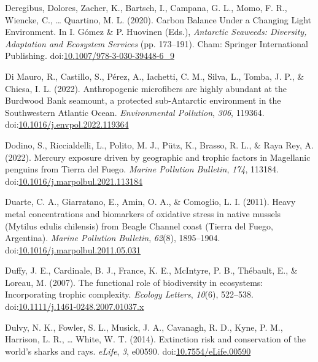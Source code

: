 \documentclass[
]{article}
\newlength{\cslhangindent}
\newenvironment{CSLReferences}[2] %
 {\begin{list}{}{%
  \setlength{\itemindent}{0pt}
  \setlength{\leftmargin}{0pt}
  \setlength{\parsep}{0pt}
  \ifodd #1
   \setlength{\leftmargin}{\cslhangindent}
   \setlength{\itemindent}{-1\cslhangindent}
  \fi
  \setlength{\itemsep}{#2\baselineskip}}}
 {\end{list}}
\begin{document}
\begin{CSLReferences}{1}{0}
Deregibus, Dolores, Zacher, K., Bartsch, I., Campana, G. L., Momo, F.
R., Wiencke, C., \ldots{} Quartino, M. L. (2020). Carbon {Balance Under}
a {Changing Light Environment}. In I. Gómez \& P. Huovinen (Eds.),
\emph{Antarctic {Seaweeds}: {Diversity}, {Adaptation} and {Ecosystem
Services}} (pp. 173--191). {Cham}: {Springer International Publishing}.
doi:\href{https://doi.org/10.1007/978-3-030-39448-6_9}{10.1007/978-3-030-39448-6\_9}

Di Mauro, R., Castillo, S., Pérez, A., Iachetti, C. M., Silva, L.,
Tomba, J. P., \& Chiesa, I. L. (2022). Anthropogenic microfibers are
highly abundant at the {Burdwood Bank} seamount, a protected
sub-{Antarctic} environment in the {Southwestern Atlantic Ocean}.
\emph{Environmental Pollution}, \emph{306}, 119364.
doi:\href{https://doi.org/10.1016/j.envpol.2022.119364}{10.1016/j.envpol.2022.119364}

Dodino, S., Riccialdelli, L., Polito, M. J., Pütz, K., Brasso, R. L., \&
Raya Rey, A. (2022). Mercury exposure driven by geographic and trophic
factors in {Magellanic} penguins from {Tierra} del {Fuego}. \emph{Marine
Pollution Bulletin}, \emph{174}, 113184.
doi:\href{https://doi.org/10.1016/j.marpolbul.2021.113184}{10.1016/j.marpolbul.2021.113184}

Duarte, C. A., Giarratano, E., Amin, O. A., \& Comoglio, L. I. (2011).
Heavy metal concentrations and biomarkers of oxidative stress in native
mussels ({Mytilus} edulis chilensis) from {Beagle Channel} coast
({Tierra} del {Fuego}, {Argentina}). \emph{Marine Pollution Bulletin},
\emph{62}(8), 1895--1904.
doi:\href{https://doi.org/10.1016/j.marpolbul.2011.05.031}{10.1016/j.marpolbul.2011.05.031}

Duffy, J. E., Cardinale, B. J., France, K. E., McIntyre, P. B.,
Thébault, E., \& Loreau, M. (2007). The functional role of biodiversity
in ecosystems: Incorporating trophic complexity. \emph{Ecology Letters},
\emph{10}(6), 522--538.
doi:\href{https://doi.org/10.1111/j.1461-0248.2007.01037.x}{10.1111/j.1461-0248.2007.01037.x}

Dulvy, N. K., Fowler, S. L., Musick, J. A., Cavanagh, R. D., Kyne, P.
M., Harrison, L. R., \ldots{} White, W. T. (2014). Extinction risk and
conservation of the world's sharks and rays. \emph{eLife}, \emph{3},
e00590.
doi:\href{https://doi.org/10.7554/eLife.00590}{10.7554/eLife.00590}


\end{CSLReferences}
\end{document}
